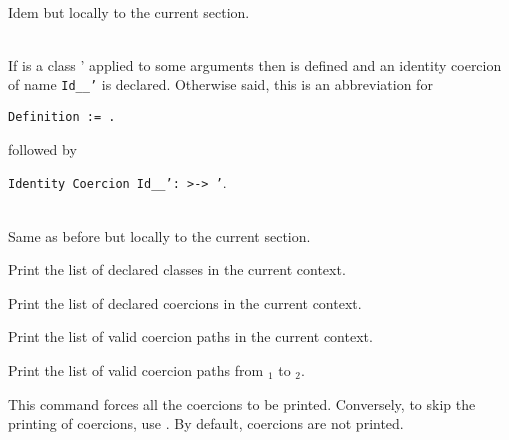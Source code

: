 \begin{Variants}
\item {} \\
Idem but locally to the current section.

\item {} \\
 If {\type} is a class
{\ident'} applied to some arguments then {\ident} is defined and an
identity coercion of name {\tt Id\_{\ident}\_{\ident'}} is
declared. Otherwise said, this is an abbreviation for 

{\tt Definition {\ident} := {\type}.} 

 followed by

{\tt Identity Coercion Id\_{\ident}\_{\ident'}:{\ident} >-> {\ident'}}.

\item {} \\
Same as before but locally to the current section.

\end{Variants}


Print the list of declared classes in the current context.

Print the list of declared coercions in the current context.

Print the list of valid coercion paths in the current context.

Print the list of valid coercion paths from {\class$_1$} to {\class$_2$}.



This command forces all the coercions to be printed.
Conversely, to skip the printing of coercions, use
 {}.
By default, coercions are not printed.


